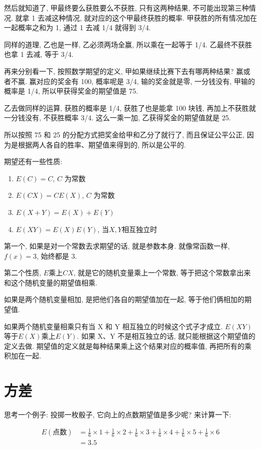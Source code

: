然后就知道了, 甲最终要么获胜要么不获胜, 只有这两种结果, 不可能出现第三种情况. 就拿 1 去减这种情况, 就对应的这个甲最终获胜的概率. 甲获胜的所有情况加在一起概率之和为 1, 通过 1 去减 1/4 就得到 3/4. 

同样的道理, 乙也是一样, 乙必须两场全赢, 所以乘在一起等于 1/4. 乙最终不获胜也拿 1 去减, 等于 3/4. 

再来分别看一下, 按照数学期望的定义, 甲如果继续比赛下去有哪两种结果? 赢或者不赢. 赢对应的奖金有 100, 概率呢是 3/4, 输的奖金就是零, 一分钱没有, 甲输的概率是 1/4, 所以甲获得奖金的期望值是 75. 

乙去做同样的运算, 获胜的概率是 1/4, 获胜了也是能拿 100 块钱, 再加上不获胜就一分钱没有, 不获胜概率 3/4. 这么一乘一加, 乙获得奖金的期望值就是 25. 

所以按照 75 和 25 的分配方式把奖金给甲和乙分了就行了, 而且保证公平公正, 因为是根据两人各自的胜率、期望值来得到的, 所以是公平的. 

期望还有一些性质:

\begin{enumerate}
  \item $E(C) = C$, $C$ 为常数 
  \item $E(CX) = CE(X)$, $C$ 为常数 
  \item $E(X+Y) = E(X) + E(Y)$ 
  \item $E(XY) = E(X)E(Y)$,  当$X,Y$相互独立时
\end{enumerate}

第一个, 如果是对一个常数去求期望的话, 就是参数本身. 就像常函数一样, $f(x) = 3$, 始终都是 3. 

第二个性质, $E$乘上$CX$, 就是它的随机变量乘上一个常数, 等于把这个常数拿出来和这个随机变量的期望值相乘. 

如果是两个随机变量相加, 是把他们各自的期望值加在一起, 等于他们俩相加的期望值. 

如果两个随机变量相乘只有当 X 和 Y 相互独立的时候这个式子才成立. $E(XY)$等于$E(X)$乘上$E(Y)$. 如果 X、Y 不是相互独立的话, 就只能根据这个期望值的定义去做. 期望值的定义就是每种结果乘上这个结果对应的概率值, 再把所有的乘积加在一起. 

\section{方差}

思考一个例子: 投掷一枚骰子, 它向上的点数期望值是多少呢? 来计算一下:

\begin{align*}
  E(\mbox{点数}) & = \frac{1}{6} \times 1 + \frac{1}{6} \times 2 + \frac{1}{6} \times 3 + \frac{1}{6} \times 4 + \frac{1}{6} \times 5 + \frac{1}{6} \times 6 \\
  & = 3.5
\end{align*}

